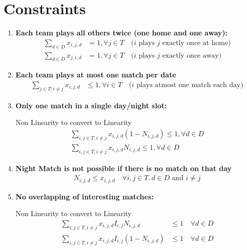 \documentclass[a4paper, 12pt]{article}
\begin{document}
\section*{Constraints}
\begin{enumerate}
    \item \textbf{Each team plays all others twice (one home and one away):}
    \begin{align*}
        \sum_{d \in D} x_{i,j,d} &= 1 , \forall j \in T \quad \text{($i$ plays $j$ exactly once at home)}\\
        \sum_{d \in D} x_{j,i,d} &= 1 , \forall j \in T \quad \text{($i$ plays $j$ exactly once away)}
    \end{align*}

    \item \textbf{Each team plays at most one match per date}
    \begin{align*}
        \sum_{j \in T; i \neq j} x_{i,j,d} &\leq 1, \forall i \in T \quad \text{($i$ plays atmost one match each day)}
    \end{align*}

    \item \textbf{Only one match in a single day/night slot:}
    
    Non Linearity to convert to Linearity
    \begin{align*}
        \sum_{i,j \in T, i \neq j} x_{i,j,d} (1-N_{i,j,d}) \leq 1, \forall d \in D \\
        \sum_{i,j \in T, i \neq j} x_{i,j,d} N_{i,j,d} \leq 1, \forall d \in D 
    \end{align*}

    \item \textbf{Night Match is not possible if there is no match on that day}
    \begin{align*}
        N_{i,j,d} \leq x_{i,j,d} \quad \forall i,j \in T, d \in D \text{ and } i \neq j
    \end{align*}

    \item \textbf{No overlapping of interesting matches:}
    
    Non Linearity to convert to Linearity
    \begin{align*}
        \sum_{i,j \in T, i \neq j} x_{i,j,d} I_{i,j} N_{i,j,d} &\leq 1 \quad \forall d \in D \\
        \sum_{i,j \in T, i \neq j} x_{i,j,d} I_{i,j} (1 - N_{i,j,d}) &\leq 1 \quad \forall d \in D
    \end{align*}


\end{enumerate}
\end{document}
